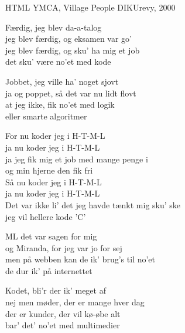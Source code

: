 \begin{song}{HTML}
  {} %
  {YMCA, Village People} %
  {} %
  {DIKUrevy, 2000} %
  {\NotCCLIed} %

  \begin{SBVerse}
    Færdig, jeg blev da-a-talog\\
    jeg blev færdig, og eksamen var go'\\
    jeg blev færdig, og sku' ha mig et job\\
    det sku' være no'et med kode
  \end{SBVerse}

  \begin{SBVerse}
    Jobbet, jeg ville ha' noget sjovt\\
    ja og poppet, så det var nu lidt flovt\\
    at jeg ikke, fik no'et med logik\\
    eller smarte algoritmer
  \end{SBVerse}

  \begin{SBChorus}
    For nu koder jeg i H-T-M-L\\
    ja nu koder jeg i H-T-M-L\\
    ja jeg fik mig et job med mange penge i\\
    og min hjerne den fik fri\\\medskip
    Så nu koder jeg i H-T-M-L\\
    ja nu koder jeg i H-T-M-L\\
    Det var ikke li' det jeg havde tænkt mig sku' ske\\
    jeg vil hellere kode 'C'
  \end{SBChorus}

  \begin{SBVerse}
    ML det var sagen for mig\\
    og Miranda, for jeg var jo for sej\\
    men på webben kan de ik' brug's til no'et\\
    de dur ik' på internettet
  \end{SBVerse}

  \begin{SBVerse}
    Kodet, bli'r der ik' meget af\\
    nej men møder, der er mange hver dag\\
    der er kunder, der vil kø-øbe alt\\
    bar' det' no'et med multimedier
  \end{SBVerse}


\end{song}
